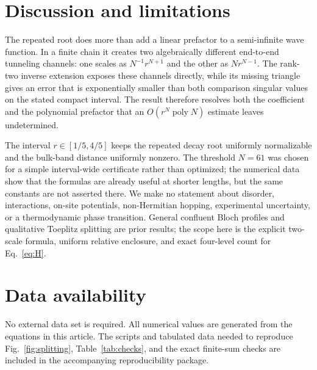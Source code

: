 \documentclass[aps,prb,reprint,superscriptaddress,longbibliography]{revtex4-2}
\begin{document}
\section{Discussion and limitations}

The repeated root does more than add a linear prefactor to a semi-infinite
wave function.  In a finite chain it creates two algebraically different
end-to-end tunneling channels: one scales as $N^{-1}r^{N+1}$ and the other as
$Nr^{N-1}$.  The rank-two inverse extension exposes these channels directly,
while its missing triangle gives an error that is exponentially smaller than
both comparison singular values on the stated compact interval.  The result
therefore resolves both the coefficient and the polynomial prefactor that an
$O(r^N\operatorname{poly}N)$ estimate leaves undetermined.

The interval $r\in[1/5,4/5]$ keeps the repeated decay root uniformly normalizable
and the bulk-band distance uniformly nonzero.  The threshold $N=61$ was chosen
for a simple interval-wide certificate rather than optimized; the numerical
data show that the formulas are already useful at shorter lengths, but the
same constants are not asserted there.  We make no statement about disorder,
interactions, on-site potentials, non-Hermitian hopping, experimental
uncertainty, or a thermodynamic phase transition.  General confluent Bloch
profiles and qualitative Toeplitz splitting are prior results; the scope here
is the explicit two-scale formula, uniform relative enclosure, and exact
four-level count for Eq.~\eqref{eq:H}.

\section*{Data availability}

No external data set is required.  All numerical values are generated from
the equations in this article.  The scripts and tabulated data needed to
reproduce Fig.~\ref{fig:splitting}, Table~\ref{tab:checks}, and the exact
finite-sum checks are included in the accompanying reproducibility package.


\end{document}

